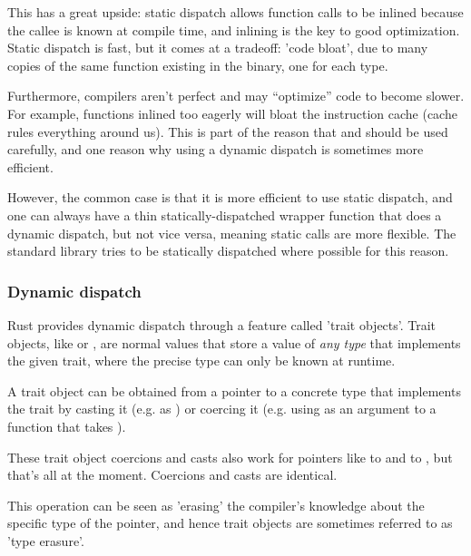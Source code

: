 This has a great upside: static dispatch allows function calls to be inlined because the callee is known at compile time, and inlining is the 
key to good optimization. Static dispatch is fast, but it comes at a tradeoff: 'code bloat', due to many copies of the same function existing 
in the binary, one for each type.

\blank

Furthermore, compilers aren't perfect and may \enquote{optimize} code to become slower. For example, functions inlined too eagerly will bloat 
the instruction cache (cache rules everything around us). This is part of the reason that \code{\#[inline]} and  
should be used carefully, and one reason why using a dynamic dispatch is sometimes more efficient.

\blank

However, the common case is that it is more efficient to use static dispatch, and one can always have a thin statically-dispatched wrapper 
function that does a dynamic dispatch, but not vice versa, meaning static calls are more flexible. The standard library tries to be 
statically dispatched where possible for this reason.

\subsubsection*{Dynamic dispatch}

Rust provides dynamic dispatch through a feature called 'trait objects'. Trait objects, like  or , are normal 
values that store a value of \emph{any type} that implements the given trait, where the precise type can only be known at runtime.

\blank

A trait object can be obtained from a pointer to a concrete type that implements the trait by casting it (e.g.  as ) 
or coercing it (e.g. using  as an argument to a function that takes ).

\blank

These trait object coercions and casts also work for pointers like  to  and  to , 
but that's all at the moment. Coercions and casts are identical.

\blank

This operation can be seen as 'erasing' the compiler's knowledge about the specific type of the pointer, and hence trait objects are 
sometimes referred to as 'type erasure'.

